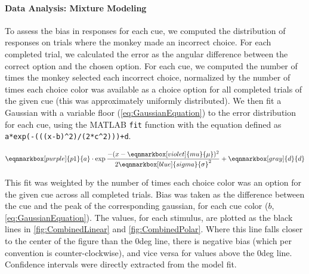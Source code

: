 \paragraph{Data Analysis: Mixture Modeling}\label{para:MixtureModeling}

To assess the bias in responses for each cue, we computed the distribution of responses on trials where the monkey made an incorrect choice. 
For each completed trial, we calculated the error as the angular difference between the correct option and the chosen option. 
For each cue, we computed the number of times the monkey selected each incorrect choice, normalized by the number of times each choice color was available as a choice option for all completed trials of the given cue (this was approximately uniformly distributed). 
We then fit a Gaussian with a variable floor (\autoref{eq:GaussianEquation}) to the error distribution for each cue, using the MATLAB \lstinline{fit} function with the equation defined as \lstinline{a*exp(-(((x-b)^2)/(2*c^2)))+d}. 



\vspace{2em} 
\begin{equation} \label{eq:GaussianEquation}
    \eqnmarkbox[purple]{p1}{a}
    \cdot
    \exp
    \frac{-(x-
    \eqnmarkbox[violet]{mu}{\mu}
    )^2}{2 
    \eqnmarkbox[blue]{sigma}{\sigma}^2}
    +
    \eqnmarkbox[gray]{d}{d}        
\end{equation}

\vspace{2em} 

This fit was weighted by the number of times each choice color was an option for the given cue across all completed trials. 
Bias was taken as the difference between the cue and the peak of the corresponding gaussian, for each cue color ($b$, \autoref{eq:GaussianEquation}). 
The values, for each stimulus, are plotted as the black lines in \autoref{fig:CombinedLinear} and \autoref{fig:CombinedPolar}. 
Where this line falls closer to the center of the figure than the 0deg line, there is negative bias (which per convention is counter-clockwise), and vice versa for values above the 0deg line. Confidence intervals were directly extracted from the model fit.


